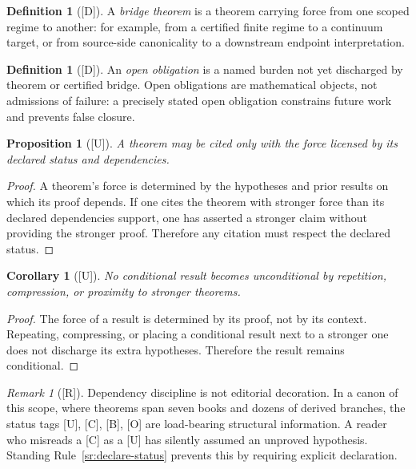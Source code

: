 \documentclass[12pt,oneside]{amsbook}
\theoremstyle{plain}
\newtheorem{proposition}[theorem]{Proposition}
\newtheorem{corollary}[theorem]{Corollary}
\theoremstyle{definition}
\newtheorem{definition}[theorem]{Definition}
\theoremstyle{remark}
\newtheorem{remark}[theorem]{Remark}
\newcommand{\status}[1]{\textup{[#1]}}
\begin{document}
\begin{definition}[\status{D}]\label{def:bridge-theorem}
A \emph{bridge theorem} is a theorem carrying force from one scoped
regime to another: for example, from a certified finite regime to a
continuum target, or from source-side canonicality to a downstream
endpoint interpretation.
\end{definition}

\begin{definition}[\status{D}]\label{def:open-obligation}
An \emph{open obligation} is a named burden not yet discharged by
theorem or certified bridge.  Open obligations are mathematical
objects, not admissions of failure: a precisely stated open obligation
constrains future work and prevents false closure.
\end{definition}

\begin{proposition}[\status{U}]\label{prop:cite-declared-force}
A theorem may be cited only with the force licensed by its declared
status and dependencies.
\end{proposition}

\begin{proof}
A theorem's force is determined by the hypotheses and prior results on
which its proof depends.  If one cites the theorem with stronger force
than its declared dependencies support, one has asserted a stronger
claim without providing the stronger proof.  Therefore any citation
must respect the declared status.
\end{proof}

\begin{corollary}[\status{U}]\label{cor:no-unconditional-by-proximity}
No conditional result becomes unconditional by repetition, compression,
or proximity to stronger theorems.
\end{corollary}

\begin{proof}
The force of a result is determined by its proof, not by its context.
Repeating, compressing, or placing a conditional result next to a
stronger one does not discharge its extra hypotheses.  Therefore the
result remains conditional.
\end{proof}

\begin{remark}[\status{R}]\label{rmk:status-not-decoration}
Dependency discipline is not editorial decoration.  In a canon of this
scope, where theorems span seven books and dozens of derived branches,
the status tags [U], [C], [B], [O] are load-bearing structural
information.  A reader who misreads a [C] as a [U] has silently assumed
an unproved hypothesis.  Standing Rule~\ref{sr:declare-status} prevents
this by requiring explicit declaration.
\end{remark}
\end{document}
